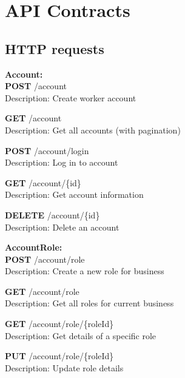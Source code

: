 \documentclass[11pt,a4paper,pdftex]{article}
\begin{document}
\section{API Contracts}
\subsection{HTTP requests}

\textbf{Account:}\\
\hspace*{1em}\textbf{POST} /account\\
\hspace*{2em}Description: Create worker account

\hspace*{1em}\textbf{GET} /account\\
\hspace*{2em}Description: Get all accounts (with pagination)

\hspace*{1em}\textbf{POST} /account/login\\
\hspace*{2em}Description: Log in to account

\hspace*{1em}\textbf{GET} /account/\{id\}\\
\hspace*{2em}Description: Get account information

\hspace*{1em}\textbf{DELETE} /account/\{id\}\\
\hspace*{2em}Description: Delete an account

\textbf{AccountRole:}\\
\hspace*{1em}\textbf{POST} /account/role\\
\hspace*{2em}Description: Create a new role for business

\hspace*{1em}\textbf{GET} /account/role\\
\hspace*{2em}Description: Get all roles for current business

\hspace*{1em}\textbf{GET} /account/role/\{roleId\}\\
\hspace*{2em}Description: Get details of a specific role

\hspace*{1em}\textbf{PUT} /account/role/\{roleId\}\\
\hspace*{2em}Description: Update role details
\end{document}

